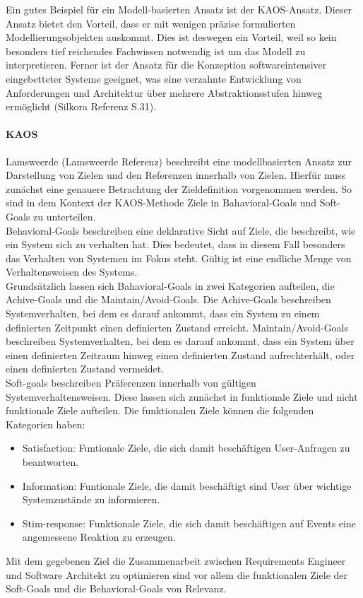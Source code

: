 Ein gutes Beispiel f\"ur ein Modell-basierten Ansatz ist der KAOS-Ansatz. Dieser Ansatz bietet den Vorteil, dass er mit wenigen pr\"azise formulierten Modellierungsobjekten auskommt. Dies ist deswegen ein Vorteil, weil so kein besonders tief reichendes Fachwissen notwendig ist um das Modell zu interpretieren. Ferner ist der Ansatz f\"ur die Konzeption softwareintensiver eingebetteter Systeme geeignet, was eine verzahnte Entwicklung von Anforderungen und Architektur \"uber mehrere Abstraktionsstufen hinweg erm\"oglicht (Silkora Referenz S.31).\\

\paragraph{KAOS}
Lamsweerde (Lamsweerde Referenz) beschreibt eine modellbasierten Ansatz zur Darstellung von Zielen und den Referenzen innerhalb von Zielen. Hierf\"ur muss zun\"achst eine genauere Betrachtung der Zieldefinition vorgenommen werden. So sind in dem Kontext der KAOS-Methode Ziele in Bahavioral-Goals und Soft-Goals zu unterteilen. \\

Behavioral-Goals beschreiben eine deklarative Sicht auf Ziele, die beschreibt, wie ein System sich zu verhalten hat. Dies bedeutet, dass in diesem Fall besonders das Verhalten von Systemen im Fokus steht. G\"ultig ist eine endliche Menge von Verhaltensweisen des Systems. \\

Grunds\"atzlich lassen sich Bahavioral-Goals in zwei Kategorien aufteilen, die Achive-Goals und die Maintain/Avoid-Goals. Die Achive-Goals beschreiben Systemverhalten, bei dem es darauf ankommt, dass ein System zu einem definierten Zeitpunkt einen definierten Zustand erreicht. Maintain/Avoid-Goals beschreiben Systemverhalten, bei dem es darauf ankommt, dass ein System \"uber einen definierten Zeitraum hinweg einen definierten Zustand aufrechterh\"alt, oder einen definierten Zustand vermeidet.\\

Soft-goals beschreiben Pr\"aferenzen innerhalb von g\"ultigen Systemverhaltensweisen. Diese lassen sich zun\"achst in funktionale Ziele und nicht funktionale Ziele aufteilen. Die funktionalen Ziele k\"onnen die folgenden Kategorien haben:
\begin{itemize}
\item Satisfaction: Funtionale Ziele, die sich damit besch\"aftigen User-Anfragen zu beantworten.
\item Information: Funtionale Ziele, die damit besch\"aftigt sind User \"uber wichtige Systemzust\"ande zu informieren.
\item Stim-response: Funktionale Ziele, die sich damit besch\"aftigen auf Events eine angemessene Reaktion zu erzeugen.
\end{itemize}
Mit dem gegebenen Ziel die Zusammenarbeit zwischen Requirements Engineer und Software Architekt zu optimieren sind vor allem die funktionalen Ziele der Soft-Goals und die Behavioral-Goals von Relevanz.\\

